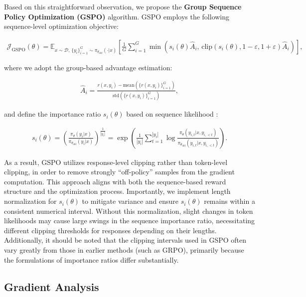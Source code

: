 Based on this straightforward observation, we propose the \textbf{Group Sequence Policy Optimization (GSPO)} algorithm. GSPO employs the following sequence-level optimization objective:

\begin{align}
\mathcal{J}_\text{GSPO} (\theta) =
\mathbb{E}_{ x \sim \mathcal{D},\, \{y_i\}_{i=1}^G \sim \pi_{\theta_\text{old}}( \cdot | x) }
\left[ 
\frac{1}{G} \sum_{i=1}^{G}
\min \left( s_{i}(\theta)  \widehat{A}_{i},  \, \mathrm{clip} \left( s_{i}(\theta), 1 - {\varepsilon}, 1 + {\varepsilon} \right) \widehat{A}_{i} \right) 
\right],
\label{equ:gspo}
\end{align}

where we adopt the group-based advantage estimation:

\begin{align}
\widehat{A}_{i} = \frac{r(x, y_i) - \mathrm{mean} \left( \{ r(x, y_i) \}_{i=1}^G \right) }{ \mathrm{std} \left( \{ r(x, y_i) \}_{i=1}^G \right) },
\end{align}

and define the importance ratio $s_{i}(\theta)$ based on sequence likelihood \citep{click}:

\begin{align}
s_{i}(\theta) = \left( \frac{ \pi_{\theta} (y_i | x) }{ \pi_{\theta_\text{old}} (y_i | x)} \right)^{\frac{1}{|y_i|}}
=
\exp \left( \frac{1}{|y_i|} \sum_{t=1}^{|y_i|} \log \frac{ \pi_{\theta} (y_{i,t} | x, y_{i,<t}) }{ \pi_{\theta_\text{old}} (y_{i,t} | x,y_{i,<t})} \right).
\end{align}

As a result, GSPO utilizes response-level clipping rather than token-level clipping, in order to remove strongly ``off-policy'' samples from the gradient computation. This approach aligns with both the sequence-based reward structure and the optimization process. Importantly, we implement length normalization for $s_{i}(\theta)$ to mitigate variance and ensure $s_{i}(\theta)$ remains within a consistent numerical interval. Without this normalization, slight changes in token likelihoods may cause large swings in the sequence importance ratio, necessitating different clipping thresholds for responses depending on their lengths. Additionally, it should be noted that the clipping intervals used in GSPO often vary greatly from those in earlier methods (such as GRPO), primarily because the formulations of importance ratios differ substantially.

\subsection{Gradient Analysis}
\label{subsec:gradient}

